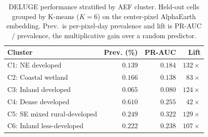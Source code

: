 \begin{table}[t]
\small
\centering
\setlength{\tabcolsep}{4pt}
\begin{tabular}{l r r r}
\toprule
\textbf{Cluster}  & \textbf{Prev. (\%)} & \textbf{PR-AUC} & \textbf{Lift} \\
\midrule
C1: NE developed             & $0.139$ & $0.184$         & $132{\times}$ \\
C2: Coastal wetland          & $0.166$ & $0.138$         & $83{\times}$ \\
C3: Inland developed         & $0.065$ & $0.080$         & $124{\times}$ \\
C4: Dense developed          & $0.610$ & $0.255$         & $42{\times}$ \\
C5: SE mixed rural-developed & $0.249$ & $0.322$ & $129{\times}$ \\
C6: Inland less-developed    & $0.222$ & $0.238$         & $107{\times}$ \\
\bottomrule
\end{tabular}
\caption{DELUGE performance stratified by AEF cluster. Held-out cells grouped by K-means ($K=6$) on the center-pixel AlphaEarth embedding. Prev.\ is per-pixel-day prevalence and lift is PR-AUC $/$ prevalence, the multiplicative gain over a random predictor.}
\label{tab:loc-char}
\end{table}

